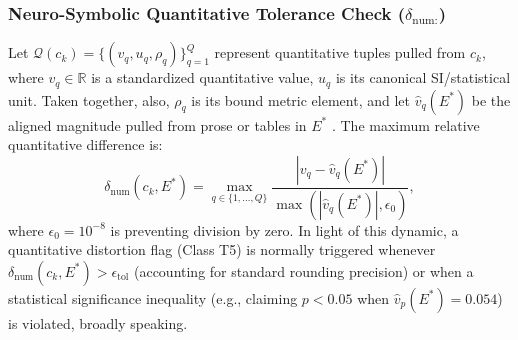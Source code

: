 \documentclass[journal]{IEEEtran}
\begin{document}
\subsubsection{Neuro-Symbolic Quantitative Tolerance Check (\texorpdfstring{$\delta_{\text{num:}}$}{delta num})}
Let $\mathcal{Q}(c_k) = \{(v_q, u_q, \rho_q)\}_{q=1}^{Q}$ represent quantitative tuples pulled from $c_k$, where $v_q \in \mathbb{R}$ is a standardized quantitative value, $u_q$ is its canonical SI/statistical unit. Taken together, also, $\rho_q$ is its bound metric element, and let $\hat{v}_q(E^*)$ be the aligned magnitude pulled from prose or tables in $E^*$ \cite{herzig2020tapas,lu2023scitab}. The maximum relative quantitative difference is:
\begin{equation}
\delta_{\text{num}}(c_k, E^*) = \max_{q \in \{1, \dots, Q\}} \frac{|v_q - \hat{v}_q(E^*)|}{\max(|\hat{v}_q(E^*)|, \epsilon_0)},
\label{eq:num_check}
\end{equation}
where $\epsilon_0 = 10^{-8}$ is preventing division by zero. In light of this dynamic, a quantitative distortion flag (Class T5) is normally triggered whenever $\delta_{\text{num}}(c_k, E^*) > \epsilon_{\text{tol}}$ (accounting for standard rounding precision) or when a statistical significance inequality (e.g., claiming $p < 0.05$ when $\hat{v}_p(E^*) = 0.054$) is violated, broadly speaking.
\end{document}
